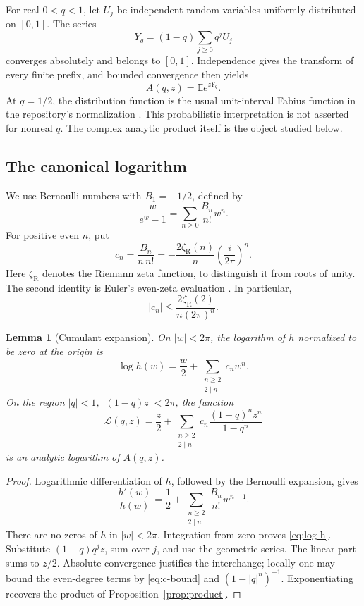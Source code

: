 \documentclass[11pt,a4paper]{article}
\numberwithin{equation}{section}
\newtheorem{lemma}[theorem]{Lemma}
\theoremstyle{definition}
\theoremstyle{remark}
\newcommand{\zR}{\zeta_{\mathrm R}}
\newcommand{\LL}{\mathcal L}
\begin{document}
For real \(0<q<1\), let \(U_j\) be independent random variables uniformly distributed on \([0,1]\). The series
\begin{equation}\label{eq:probability}
 Y_q=(1-q)\sum_{j\ge0}q^jU_j
\end{equation}
converges absolutely and belongs to \([0,1]\). Independence gives the transform of every finite prefix, and bounded convergence then yields
\[
 A(q,z)=\mathbb E e^{zY_q}.
\]
At \(q=1/2\), the distribution function is the usual unit-interval Fabius function in the repository's normalization \cite{repo}. This probabilistic interpretation is not asserted for nonreal \(q\). The complex analytic product itself is the object studied below.

\subsection{The canonical logarithm}
We use Bernoulli numbers with \(B_1=-1/2\), defined by
\[
 \frac{w}{e^w-1}=\sum_{n\ge0}\frac{B_n}{n!}w^n.
\]
For positive even \(n\), put
\begin{equation}\label{eq:cn}
 c_n=\frac{B_n}{n\,n!}
     =-\frac{2\zR(n)}{n}\left(\frac{i}{2\pi}\right)^n.
\end{equation}
Here \(\zR\) denotes the Riemann zeta function, to distinguish it from roots of unity. The second identity is Euler's even-zeta evaluation \cite[\S25.6]{dlmf}. In particular,
\begin{equation}\label{eq:c-bound}
 |c_n|\le\frac{2\zR(2)}{n(2\pi)^n}.
\end{equation}

\begin{lemma}[Cumulant expansion]\label{lem:log}
On \(|w|<2\pi\), the logarithm of \(h\) normalized to be zero at the origin is
\begin{equation}\label{eq:log-h}
 \log h(w)=\frac w2+\sum_{\substack{n\ge2\\2\mid n}}c_nw^n.
\end{equation}
On the region \(|q|<1\), \(|(1-q)z|<2\pi\), the function
\begin{equation}\label{eq:log-A}
 \LL(q,z)=\frac z2+
 \sum_{\substack{n\ge2\\2\mid n}}
 c_n\frac{(1-q)^nz^n}{1-q^n}
\end{equation}
is an analytic logarithm of \(A(q,z)\).
\end{lemma}
\begin{proof}
Logarithmic differentiation of \(h\), followed by the Bernoulli expansion, gives
\[
 \frac{h'(w)}{h(w)}=\frac12+
 \sum_{\substack{n\ge2\\2\mid n}}\frac{B_n}{n!}w^{n-1}.
\]
There are no zeros of \(h\) in \(|w|<2\pi\). Integration from zero proves \eqref{eq:log-h}. Substitute \((1-q)q^jz\), sum over \(j\), and use the geometric series. The linear part sums to \(z/2\). Absolute convergence justifies the interchange; locally one may bound the even-degree terms by \eqref{eq:c-bound} and \((1-|q|^n)^{-1}\). Exponentiating recovers the product of Proposition~\ref{prop:product}.
\end{proof}
\end{document}
